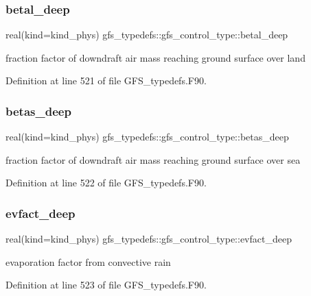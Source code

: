 \subsubsection{betal\+\_\+deep}
{\footnotesize\ttfamily real(kind=kind\+\_\+phys) gfs\+\_\+typedefs\+::gfs\+\_\+control\+\_\+type\+::betal\+\_\+deep}



fraction factor of downdraft air mass reaching ground surface over land 



Definition at line 521 of file G\+F\+S\+\_\+typedefs.\+F90.

\mbox{\label{structgfs__typedefs_1_1gfs__control__type_a4d91ddfef63c07a7d119d278719daaa3}} 
\subsubsection{betas\+\_\+deep}
{\footnotesize\ttfamily real(kind=kind\+\_\+phys) gfs\+\_\+typedefs\+::gfs\+\_\+control\+\_\+type\+::betas\+\_\+deep}



fraction factor of downdraft air mass reaching ground surface over sea 



Definition at line 522 of file G\+F\+S\+\_\+typedefs.\+F90.

\mbox{\label{structgfs__typedefs_1_1gfs__control__type_a52b9098eecfca26427d8e8405217ca1a}} 
\subsubsection{evfact\+\_\+deep}
{\footnotesize\ttfamily real(kind=kind\+\_\+phys) gfs\+\_\+typedefs\+::gfs\+\_\+control\+\_\+type\+::evfact\+\_\+deep}



evaporation factor from convective rain 



Definition at line 523 of file G\+F\+S\+\_\+typedefs.\+F90.


